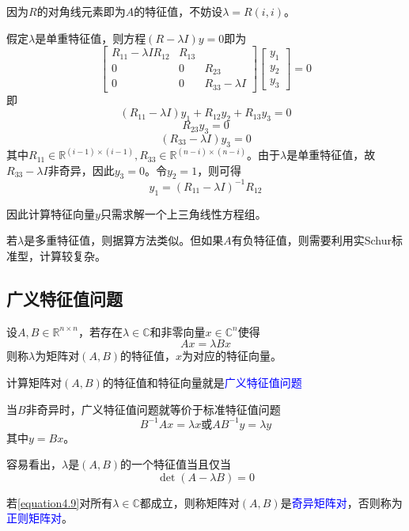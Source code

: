 \documentclass[12pt,a4paper]{article}
\begin{document}
因为$R$的对角线元素即为$A$的特征值，不妨设$\lambda=R(i,i)$。

假定$\lambda$是单重特征值，则方程$(R-\lambda I)y=0$即为$$
\left[\begin{array}{ccc}{R_{11}-\lambda I R_{12}} & {R_{13}} \\ {0} & {0} & {R_{23}} \\ {0} & {0} & {R_{33}-\lambda I}\end{array}\right]\left[\begin{array}{l}{y_{1}} \\ {y_{2}} \\ {y_{3}}\end{array}\right]=0
$$即\begin{equation}
\left(R_{11}-\lambda I\right) y_{1}+R_{12} y_{2}+R_{13} y_{3}=0
\end{equation}\begin{equation}
R_{23} y_{3}=0
\end{equation}\begin{equation}
\left(R_{33}-\lambda I\right) y_{3}=0
\end{equation}其中$R_{11} \in \mathbb{R}^{(i-1) \times(i-1)}, R_{33} \in \mathbb{R}^{(n-i) \times(n-i)}$。由于$\lambda$是单重特征值，故
$R_{33}-\lambda I$非奇异，因此$y_3=0$。令$y_2=1$，则可得$$
y_{1}=\left(R_{11}-\lambda I\right)^{-1} R_{12}
$$

因此计算特征向量$y$只需求解一个上三角线性方程组。

若$\lambda$是多重特征值，则据算方法类似。但如果$A$有负特征值，则需要利用实Schur标准型，计算较复杂。
\subsection{广义特征值问题}
设$A, B \in \mathbb{R}^{n \times n}$，若存在$\lambda \in \mathbb{C}$和非零向量$x \in \mathbb{C}^{n}$使得$$
A x=\lambda B x
$$则称$\lambda$为矩阵对$(A,B)$的特征值，$x$为对应的特征向量。

计算矩阵对$(A,B)$的特征值和特征向量就是\textcolor{blue}{广义特征值问题}

当$B$非奇异时，广义特征值问题就等价于标准特征值问题$$
B^{-1} A x=\lambda x
 \text{或}A B^{-1} y=\lambda y
$$其中$y=Bx$。

容易看出，$\lambda$是$(A,B)$的一个特征值当且仅当\begin{equation}
\operatorname{det}(A-\lambda B)=0
\label{equation4.9}
\end{equation}

若\ref{equation4.9}对所有$\lambda \in \mathbb{C}$都成立，则称矩阵对$(A,B)$是\textcolor{blue}{奇异矩阵对}，否则称为\textcolor{blue}{正则矩阵对}。
\end{document}
